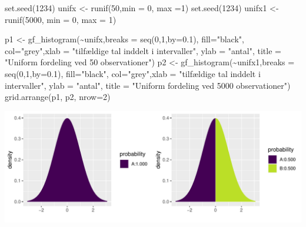 \documentclass[
]{article}
\newenvironment{Shaded}{\begin{snugshade}}{\end{snugshade}}
\newcommand{\AttributeTok}[1]{\textcolor[rgb]{0.77,0.63,0.00}{#1}}
\newcommand{\DecValTok}[1]{\textcolor[rgb]{0.00,0.00,0.81}{#1}}
\newcommand{\FloatTok}[1]{\textcolor[rgb]{0.00,0.00,0.81}{#1}}
\newcommand{\FunctionTok}[1]{\textcolor[rgb]{0.00,0.00,0.00}{#1}}
\newcommand{\NormalTok}[1]{#1}
\newcommand{\OtherTok}[1]{\textcolor[rgb]{0.56,0.35,0.01}{#1}}
\newcommand{\SpecialCharTok}[1]{\textcolor[rgb]{0.00,0.00,0.00}{#1}}
\newcommand{\StringTok}[1]{\textcolor[rgb]{0.31,0.60,0.02}{#1}}
\begin{document}
\begin{Shaded}
\begin{Highlighting}[]
\FunctionTok{set.seed}\NormalTok{(}\DecValTok{1234}\NormalTok{)}
\NormalTok{unifx }\OtherTok{\textless{}{-}} \FunctionTok{runif}\NormalTok{(}\DecValTok{50}\NormalTok{,}\AttributeTok{min =} \DecValTok{0}\NormalTok{, }\AttributeTok{max =}\DecValTok{1}\NormalTok{)}
\FunctionTok{set.seed}\NormalTok{(}\DecValTok{1234}\NormalTok{)}
\NormalTok{unifx1 }\OtherTok{\textless{}{-}} \FunctionTok{runif}\NormalTok{(}\DecValTok{5000}\NormalTok{, }\AttributeTok{min =} \DecValTok{0}\NormalTok{, }\AttributeTok{max =} \DecValTok{1}\NormalTok{)}

\NormalTok{p1 }\OtherTok{\textless{}{-}} \FunctionTok{gf\_histogram}\NormalTok{(}\SpecialCharTok{\textasciitilde{}}\NormalTok{unifx,}\AttributeTok{breaks =} \FunctionTok{seq}\NormalTok{(}\DecValTok{0}\NormalTok{,}\DecValTok{1}\NormalTok{,}\AttributeTok{by=}\FloatTok{0.1}\NormalTok{), }\AttributeTok{fill=}\StringTok{"black"}\NormalTok{, }\AttributeTok{col=}\StringTok{"grey"}\NormalTok{,}\AttributeTok{xlab =} \StringTok{"tilfældige tal inddelt i intervaller"}\NormalTok{, }\AttributeTok{ylab =} \StringTok{"antal"}\NormalTok{, }\AttributeTok{title =} \StringTok{"Uniform fordeling ved 50 observationer"}\NormalTok{)}
\NormalTok{p2 }\OtherTok{\textless{}{-}} \FunctionTok{gf\_histogram}\NormalTok{(}\SpecialCharTok{\textasciitilde{}}\NormalTok{unifx1,}\AttributeTok{breaks =} \FunctionTok{seq}\NormalTok{(}\DecValTok{0}\NormalTok{,}\DecValTok{1}\NormalTok{,}\AttributeTok{by=}\FloatTok{0.1}\NormalTok{), }\AttributeTok{fill=}\StringTok{"black"}\NormalTok{, }\AttributeTok{col=}\StringTok{"grey"}\NormalTok{,}\AttributeTok{xlab =} \StringTok{"tilfældige tal inddelt i intervaller"}\NormalTok{, }\AttributeTok{ylab =} \StringTok{"antal"}\NormalTok{, }\AttributeTok{title =} \StringTok{"Uniform fordeling ved 5000 observationer"}\NormalTok{)}
\FunctionTok{grid.arrange}\NormalTok{(p1, p2, }\AttributeTok{nrow=}\DecValTok{2}\NormalTok{)}
\end{Highlighting}
\end{Shaded}

\includegraphics{TP2_files/figure-latex/unnamed-chunk-15-1.pdf}
\end{document}
